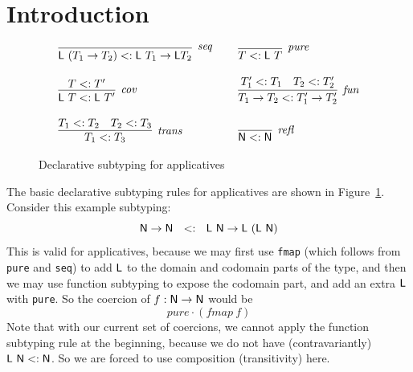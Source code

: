 \documentclass[acmsmall,screen,review]{acmart}
\begin{document}

\theoremstyle{definition}
\newtheorem{specification}[section]{Specification}

\maketitle

\section{Introduction}


\begin{figure}
  \[
\begin{array}{lll}
  \infer[\textit{seq}]{\tl\ (T_1 \to T_2) <: \tl\ T_1 \to \tl T_2}{\ }
  &\ &
  \infer[\textit{pure}]{T <: \tl\ T}{\ }
\\ \\
  \infer[\textit{cov}]{\tl\ T <: \tl\ T'}{T <: T'}
  &\ &
  \infer[\textit{fun}]{T_1 \to T_2 <: T_1' \to T_2'}{T_1'<: T_1 & T_2 <: T_2'}
      \\ \\ 
      \infer[\textit{trans}]{T_1<: T_3}{T_1 <: T_2 & T_2 <: T_3}
        &\ &
        \infer[\textit{refl}]{\tn <: \tn}{\ }
  \end{array}
\]
\caption{Declarative subtyping for applicatives}
\label{fig:decl}
\end{figure}


The basic declarative subtyping rules for applicatives are shown in Figure~\ref{fig:decl}.  Consider this example subtyping:
\[
\tn \to \tn \ \ <: \ \ \tl\ \tn \to \tl\ (\tl\ \tn)
\]
This is valid for applicatives, because we may first use \texttt{fmap}
(which follows from \texttt{pure} and \texttt{seq}) to add $\mathsf{L}$ to the
domain and codomain parts of the type, and then we may use function subtyping
to expose the codomain part, and add an extra $\mathsf{L}$ with \texttt{pure}. So the
coercion of $f : \mathsf{N} \to \mathsf{N}$ would be
\[
\textit{pure} \cdot (\textit{fmap}\ f)
\]
\noindent Note that with our current set of coercions, we cannot apply the function
subtyping rule at the beginning, because we do not have (contravariantly) $\mathsf{L}\ \mathsf{N} <: \mathsf{N}$.
So we are forced to use composition (transitivity) here.
\end{document}
